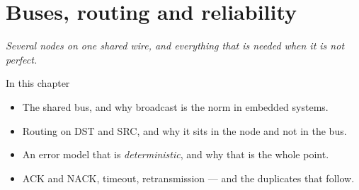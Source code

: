 \chapter{Buses, routing and reliability}
\label{ch:bussar}


{\large\itshape Several nodes on one shared wire, and everything that is needed when it is not
perfect.\par}

\begin{chapterbox}{In this chapter}
\begin{itemize}
  \item The shared bus, and why broadcast is the norm in embedded systems.
  \item Routing on DST and SRC, and why it sits in the node and not in the bus.
  \item An error model that is \emph{deterministic}, and why that is the whole point.
  \item ACK and NACK, timeout, retransmission --- and the duplicates that follow.
\end{itemize}
\end{chapterbox}







